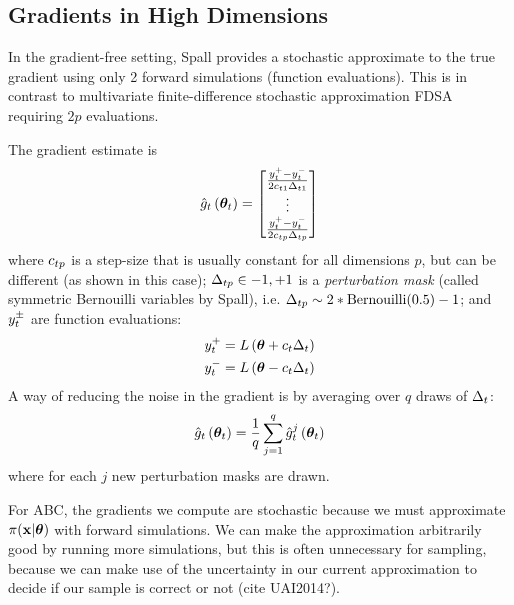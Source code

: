 \documentclass[]{article}
\begin{document}
\subsection{Gradients in High Dimensions}

In the gradient-free setting, Spall \cite{spall_spsa} provides a stochastic approximate to the true gradient using only 2 forward simulations (function evaluations).  This is in contrast to multivariate finite-difference stochastic approximation FDSA \cite{kiefer1952} requiring $2p$ evaluations.  

The gradient estimate is
\begin{equation}
  \gradestimate{t}{\thetav_t} = \begin{bmatrix} 
                                   \frac{\feval{t}{+} - \feval{t}{-}}{2 \cstep{t}{1} \dstep{t}{1}} \\
                                   \vdots \\
                                   \frac{\feval{t}{+} - \feval{t}{-}}{2 \cstep{t}{p} \dstep{t}{p}} \\
                                \end{bmatrix}
\end{equation}
where $\cstep{t}{p}$ is a step-size that is usually constant for all dimensions $p$, but can be different (as shown in this case); $\dstep{t}{p} \in {-1, +1}$ is a {\em perturbation mask} (called symmetric Bernouilli variables by Spall), i.e. $\dstep{t}{p} \sim 2*\text{Bernouilli}(0.5) - 1$; and  $\feval{t}{\pm}$ are function evaluations:
\begin{eqnarray}
  \feval{t}{+} &= \loglik{\thetav + \cstepconst{t}\dstepconst{t}} \\
  \feval{t}{-} &= \loglik{\thetav - \cstepconst{t}\dstepconst{t}}
\end{eqnarray}
A way of reducing the noise in the gradient is by averaging over $q$ draws of $\dstepconst{t}$:
\begin{equation}
  \gradestimate{t}{\thetav_t} = \frac{1}{q} \sum_{j=1}^q \gradestimaterepeat{t}{\thetav_t}{j}
\end{equation}
where for each $j$ new perturbation masks are drawn.
  

For ABC, the gradients we compute are stochastic because we must approximate $\pi(\x | \thetav)$ with forward simulations.  We can make the approximation arbitrarily good by running more simulations, but this is often unnecessary for sampling, because we can make use of the uncertainty in our current approximation to decide if our sample is correct or not (cite UAI2014?).  
\end{document}
